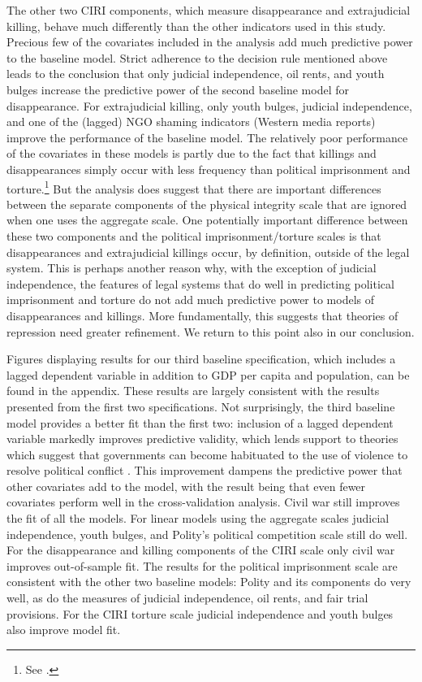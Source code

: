 \documentclass[11pt]{article}
\begin{document}
The other two CIRI components, which measure disappearance and extrajudicial killing, behave much differently than the other indicators used in this study. Precious few of the covariates included in the analysis add much predictive power to the baseline model. Strict adherence to the decision rule mentioned above leads to the conclusion that only judicial independence, oil rents, and youth bulges increase the predictive power of the second baseline model for disappearance. For extrajudicial killing, only youth bulges, judicial independence, and one of the (lagged) NGO shaming indicators (Western media reports) improve the performance of the baseline model. The relatively poor performance of the covariates in these models is partly due to the fact that killings and disappearances simply occur with less frequency than political imprisonment and torture.\footnote{See \citet{CingranelliRichards1999isq}.} But the analysis does suggest that there are important differences between the separate components of the physical integrity scale that are ignored when one uses the aggregate scale. One potentially important difference between these two components and the political imprisonment/torture scales is that disappearances and extrajudicial killings occur, by definition, outside of the legal system. This is perhaps another reason why, with the exception of judicial independence, the features of legal systems that do well in predicting political imprisonment and torture do not add much predictive power to models of disappearances and killings. More fundamentally, this suggests that theories of repression need greater refinement. We return to this point also in our conclusion.

Figures displaying results for our third baseline specification, which includes a lagged dependent variable in addition to GDP per capita and population, can be found in the appendix. These results are largely consistent with the results presented from the first two specifications. Not surprisingly, the third baseline model provides a better fit than the first two: inclusion of a lagged dependent variable markedly improves predictive validity, which lends support to theories which suggest that governments can become habituated to the use of violence to resolve political conflict \citep{Gurr1988}. This improvement dampens the predictive power that other covariates add to the model, with the result being that even fewer covariates perform well in the cross-validation analysis. Civil war still improves the fit of all the models. For linear models using the aggregate scales judicial independence, youth bulges, and Polity's political competition scale still do well. For the disappearance and killing components of the CIRI scale only civil war improves out-of-sample fit. The results for the political imprisonment scale are consistent with the other two baseline models: Polity and its components do very well, as do the measures of judicial independence, oil rents, and fair trial provisions. For the CIRI torture scale judicial independence and youth bulges also improve model fit. 
\end{document}
